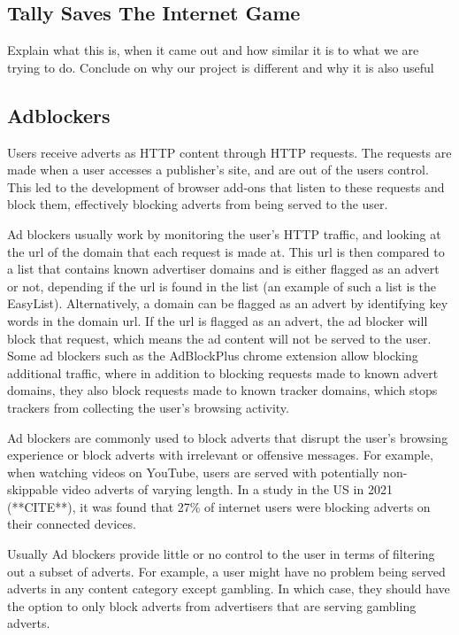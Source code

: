 \documentclass{l4proj}
\begin{document}
\subsection{Tally Saves The Internet Game}
Explain what this is, when it came out and how similar it is to what we are trying to do. Conclude on why our project is different and why it is also useful

\subsection{Adblockers}
Users receive adverts as HTTP content through HTTP requests. The requests are made when a user accesses a publisher's site, and are out of the users control. This led to the development of browser add-ons that listen to these requests and block them, effectively blocking adverts from being served to the user. 

Ad blockers usually work by monitoring the user's HTTP traffic, and looking at the url of the domain that each request is made at. This url is then compared to a list that contains known advertiser domains and is either flagged as an advert or not, depending if the url is found in the list (an example of such a list is the EasyList). Alternatively, a domain can be flagged as an advert by identifying key words in the domain url. If the url is flagged as an advert, the ad blocker will block that request, which means the ad content will not be served to the user. Some ad blockers such as the AdBlockPlus chrome extension allow blocking additional traffic, where in addition to blocking requests made to known advert domains, they also block requests made to known tracker domains, which stops trackers from collecting the user's browsing activity.

Ad blockers are commonly used to block adverts that disrupt the user's browsing experience or block adverts with irrelevant or offensive messages. For example, when watching videos on YouTube, users are served with potentially non-skippable video adverts of varying length. In a study in the US in 2021 (**CITE**), it was found that 27\% of internet users were blocking adverts on their connected devices. 

Usually Ad blockers provide little or no control to the user in terms of filtering out a subset of adverts. For example, a user might have no problem being served adverts in any content category except gambling. In which case, they should have the option to only block adverts from advertisers that are serving gambling adverts. 
\end{document}
